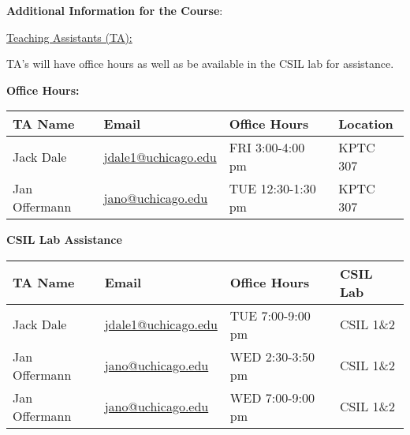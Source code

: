 \noindent \textbf {\Large \sc Additional Information for the Course}:

\vspace{1cm}

\noindent \underline{Teaching Assistants (TA):}

\noindent TA's will have office hours as well as be available in the CSIL lab for assistance.

\textbf{Office Hours:}

\begin{tabular}{l l | l | l }

TA Name & Email & Office Hours & Location \\ \hline

Jack Dale          & \href{mailto:jdale1@uchicago.edu}{jdale1@uchicago.edu}  & FRI  3:00-4:00 pm  & KPTC 307 \\
Jan Offermann      & \href{mailto:jano@uchicago.edu}{jano@uchicago.edu}      & TUE 12:30-1:30 pm  & KPTC 307 \\


\end{tabular}

\vspace{1cm}

\textbf{CSIL Lab Assistance}

\begin{tabular}{l l | l | l }

TA Name & Email & Office Hours & CSIL Lab \\ \hline

Jack Dale          & \href{mailto:jdale1@uchicago.edu}{jdale1@uchicago.edu}  & TUE  7:00-9:00 pm  & CSIL 1\&2 \\
Jan Offermann      & \href{mailto:jano@uchicago.edu}{jano@uchicago.edu}      & WED  2:30-3:50 pm  & CSIL 1\&2 \\
Jan Offermann      & \href{mailto:jano@uchicago.edu}{jano@uchicago.edu}      & WED  7:00-9:00 pm  & CSIL 1\&2 \\


\end{tabular}

\vspace{1cm}

